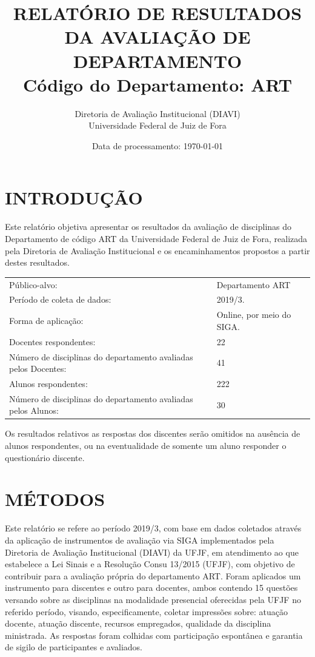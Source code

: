 \documentclass[a4paper,10pt]{article}
\date{Data de processamento: \today}
\begin{document}
\author{Diretoria de Avaliação Institucional (DIAVI) \\ Universidade Federal de Juiz de Fora}

\title{RELATÓRIO DE RESULTADOS DA AVALIAÇÃO DE DEPARTAMENTO\\ Código do Departamento: ART}
\maketitle
\section{INTRODUÇÃO}
Este relatório objetiva apresentar os resultados da avaliação de disciplinas do Departamento     de código ART da Universidade Federal de Juiz de Fora, realizada pela     Diretoria de Avaliação Institucional e os encaminhamentos propostos a     partir destes resultados.

\begin{center}
\begin{tabularx}{\linewidth}{X|l}

Público-alvo:& Departamento  ART\\

Período de coleta de dados:& 2019/3.\\

Forma de aplicação:& Online, por meio do SIGA.\\

Docentes respondentes:& 22\\

Número de disciplinas do departamento avaliadas pelos Docentes:& 41\\

Alunos   respondentes:& 222\\

Número de disciplinas do departamento  avaliadas pelos   Alunos:& 30\\
\end{tabularx}
\end{center}

Os resultados relativos as respostas dos discentes serão omitidos na ausência de alunos respondentes, ou na eventualidade de somente um aluno responder o questionário discente.
\section{MÉTODOS}
Este relatório se refere ao período 2019/3, com base em dados     coletados através da aplicação de instrumentos de avaliação via SIGA     implementados pela Diretoria de Avaliação Institucional (DIAVI) da UFJF, em atendimento     ao que estabelece a Lei Sinais e a Resolução Consu 13/2015 (UFJF),     com objetivo de contribuir para a avaliação própria do departamento ART.    Foram aplicados um instrumento para discentes e outro para docentes, ambos contendo     15 questões versando sobre as disciplinas na modalidade presencial oferecidas pela UFJF no     referido período, visando, especificamente, coletar impressões sobre: atuação docente, atuação discente,     recursos empregados, qualidade da disciplina ministrada.     As respostas foram colhidas      com participação espontânea e garantia de    sigilo de participantes e avaliados.
\end{document}
